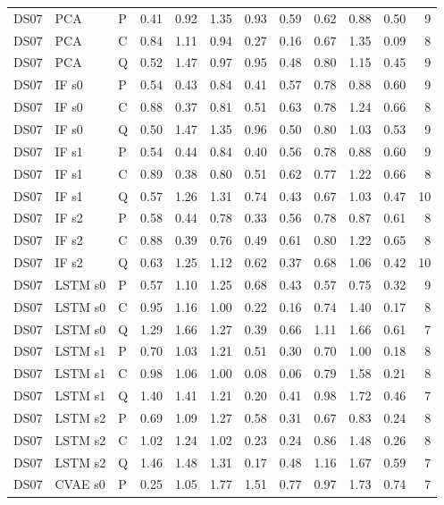 \documentclass[10pt]{article}
\begin{document}
{\begin{longtable}{lllrrrrrrrrr}
\midrule
DS07 & PCA & P & 0.41 & 0.92 & 1.35 & 0.93 & 0.59 & 0.62 & 0.88 & 0.50 & 9 \\
DS07 & PCA & C & 0.84 & 1.11 & 0.94 & 0.27 & 0.16 & 0.67 & 1.35 & 0.09 & 8 \\
DS07 & PCA & Q & 0.52 & 1.47 & 0.97 & 0.95 & 0.48 & 0.80 & 1.15 & 0.45 & 9 \\
DS07 & IF s0 & P & 0.54 & 0.43 & 0.84 & 0.41 & 0.57 & 0.78 & 0.88 & 0.60 & 9 \\
DS07 & IF s0 & C & 0.88 & 0.37 & 0.81 & 0.51 & 0.63 & 0.78 & 1.24 & 0.66 & 8 \\
DS07 & IF s0 & Q & 0.50 & 1.47 & 1.35 & 0.96 & 0.50 & 0.80 & 1.03 & 0.53 & 9 \\
DS07 & IF s1 & P & 0.54 & 0.44 & 0.84 & 0.40 & 0.56 & 0.78 & 0.88 & 0.60 & 9 \\
DS07 & IF s1 & C & 0.89 & 0.38 & 0.80 & 0.51 & 0.62 & 0.77 & 1.22 & 0.66 & 8 \\
DS07 & IF s1 & Q & 0.57 & 1.26 & 1.31 & 0.74 & 0.43 & 0.67 & 1.03 & 0.47 & 10 \\
DS07 & IF s2 & P & 0.58 & 0.44 & 0.78 & 0.33 & 0.56 & 0.78 & 0.87 & 0.61 & 8 \\
DS07 & IF s2 & C & 0.88 & 0.39 & 0.76 & 0.49 & 0.61 & 0.80 & 1.22 & 0.65 & 8 \\
DS07 & IF s2 & Q & 0.63 & 1.25 & 1.12 & 0.62 & 0.37 & 0.68 & 1.06 & 0.42 & 10 \\
DS07 & LSTM s0 & P & 0.57 & 1.10 & 1.25 & 0.68 & 0.43 & 0.57 & 0.75 & 0.32 & 9 \\
DS07 & LSTM s0 & C & 0.95 & 1.16 & 1.00 & 0.22 & 0.16 & 0.74 & 1.40 & 0.17 & 8 \\
DS07 & LSTM s0 & Q & 1.29 & 1.66 & 1.27 & 0.39 & 0.66 & 1.11 & 1.66 & 0.61 & 7 \\
DS07 & LSTM s1 & P & 0.70 & 1.03 & 1.21 & 0.51 & 0.30 & 0.70 & 1.00 & 0.18 & 8 \\
DS07 & LSTM s1 & C & 0.98 & 1.06 & 1.00 & 0.08 & 0.06 & 0.79 & 1.58 & 0.21 & 8 \\
DS07 & LSTM s1 & Q & 1.40 & 1.41 & 1.21 & 0.20 & 0.41 & 0.98 & 1.72 & 0.46 & 7 \\
DS07 & LSTM s2 & P & 0.69 & 1.09 & 1.27 & 0.58 & 0.31 & 0.67 & 0.83 & 0.24 & 8 \\
DS07 & LSTM s2 & C & 1.02 & 1.24 & 1.02 & 0.23 & 0.24 & 0.86 & 1.48 & 0.26 & 8 \\
DS07 & LSTM s2 & Q & 1.46 & 1.48 & 1.31 & 0.17 & 0.48 & 1.16 & 1.67 & 0.59 & 7 \\
DS07 & CVAE s0 & P & 0.25 & 1.05 & 1.77 & 1.51 & 0.77 & 0.97 & 1.73 & 0.74 & 7 \\

\end{longtable}}
\end{document}
